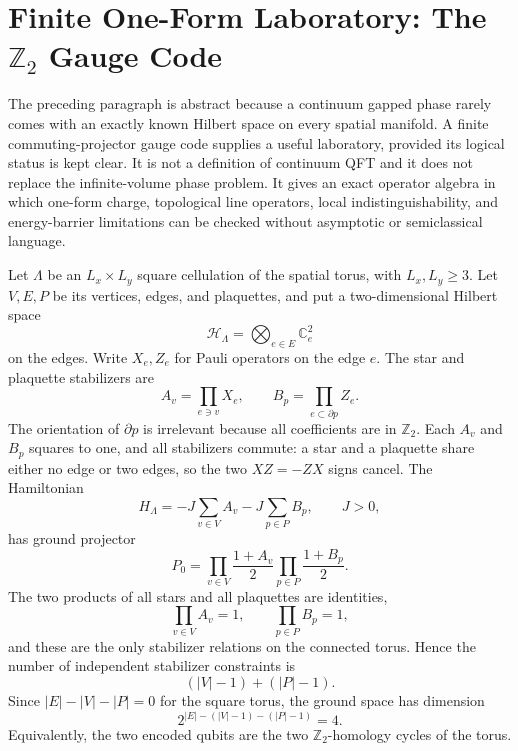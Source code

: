 \section{Finite One-Form Laboratory: The \texorpdfstring{\(\mathbb Z_2\)}{Z2} Gauge Code}
\label{sec:finite-one-form-laboratory-z2-code}

The preceding paragraph is abstract because a continuum gapped phase rarely
comes with an exactly known Hilbert space on every spatial manifold.  A finite
commuting-projector gauge code supplies a useful laboratory, provided its
logical status is kept clear.  It is not a definition of continuum QFT and it
does not replace the infinite-volume phase problem.  It gives an exact
operator algebra in which one-form charge, topological line operators, local
indistinguishability, and energy-barrier limitations can be checked without
asymptotic or semiclassical language.

Let \(\Lambda\) be an \(L_x\times L_y\) square cellulation of the spatial
torus, with \(L_x,L_y\geq 3\).  Let \(V,E,P\) be its vertices, edges, and
plaquettes, and put a two-dimensional Hilbert space
\[
  \mathcal H_\Lambda=\bigotimes_{e\in E}\mathbb C^2_e
\]
on the edges.  Write \(X_e,Z_e\) for Pauli operators on the edge \(e\).  The
star and plaquette stabilizers are
\begin{equation}
  A_v=\prod_{e\ni v}X_e,\qquad
  B_p=\prod_{e\subset\partial p}Z_e .
  \label{eq:z2-code-star-plaquette-stabilizers}
\end{equation}
The orientation of \(\partial p\) is irrelevant because all coefficients are
in \(\mathbb Z_2\).  Each \(A_v\) and \(B_p\) squares to one, and all
stabilizers commute: a star and a plaquette share either no edge or two edges,
so the two \(XZ=-ZX\) signs cancel.  The Hamiltonian
\begin{equation}
  H_\Lambda=-J\sum_{v\in V}A_v-J\sum_{p\in P}B_p,\qquad J>0,
  \label{eq:z2-code-hamiltonian}
\end{equation}
has ground projector
\begin{equation}
  P_0=
  \prod_{v\in V}\frac{1+A_v}{2}
  \prod_{p\in P}\frac{1+B_p}{2}.
  \label{eq:z2-code-ground-projector}
\end{equation}
The two products of all stars and all plaquettes are identities,
\[
  \prod_{v\in V}A_v=1,\qquad \prod_{p\in P}B_p=1,
\]
and these are the only stabilizer relations on the connected torus.  Hence
the number of independent stabilizer constraints is
\[
  (|V|-1)+(|P|-1).
\]
Since \(|E|-|V|-|P|=0\) for the square torus, the ground space has dimension
\[
  2^{|E|-(|V|-1)-(|P|-1)}=4.
\]
Equivalently, the two encoded qubits are the two \(\mathbb Z_2\)-homology
cycles of the torus.

